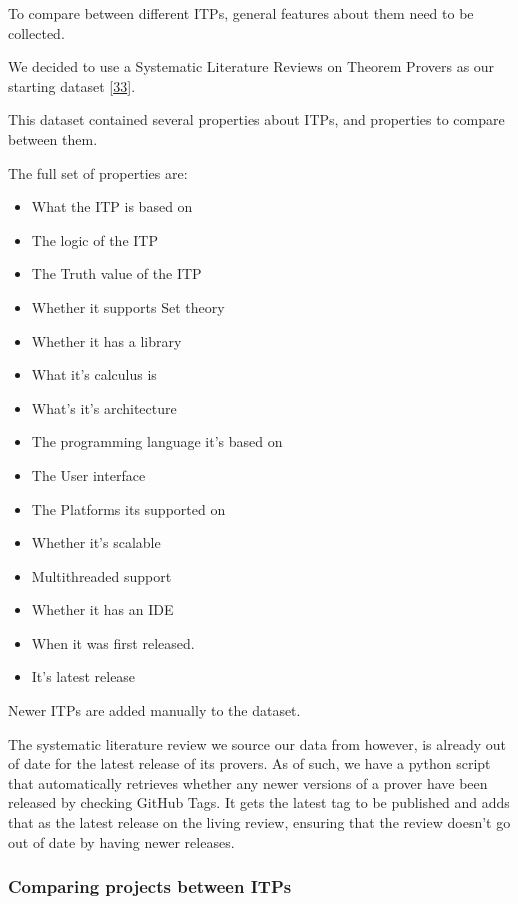 \documentclass[
]{article}
\providecommand{\tightlist}{%
  \setlength{\itemsep}{0pt}\setlength{\parskip}{0pt}}
\begin{document}
To compare between different ITPs, general features about them need to
be collected.

We decided to use a Systematic Literature Reviews on Theorem Provers as
our starting dataset
{[}\protect\hyperlink{ref-nawaz_survey_2019}{33}{]}.

This dataset contained several properties about ITPs, and properties to
compare between them.

The full set of properties are:

\begin{itemize}
\tightlist
\item
  What the ITP is based on
\item
  The logic of the ITP
\item
  The Truth value of the ITP
\item
  Whether it supports Set theory
\item
  Whether it has a library
\item
  What it's calculus is
\item
  What's it's architecture
\item
  The programming language it's based on
\item
  The User interface
\item
  The Platforms its supported on
\item
  Whether it's scalable
\item
  Multithreaded support
\item
  Whether it has an IDE
\item
  When it was first released.
\item
  It's latest release
\end{itemize}

Newer ITPs are added manually to the dataset.

The systematic literature review we source our data from however, is
already out of date for the latest release of its provers. As of such,
we have a python script that automatically retrieves whether any newer
versions of a prover have been released by checking GitHub Tags. It gets
the latest tag to be published and adds that as the latest release on
the living review, ensuring that the review doesn't go out of date by
having newer releases.

\hypertarget{comparing-projects-between-itps}{%
\subsubsection{Comparing projects between
ITPs}\label{comparing-projects-between-itps}}
\end{document}
